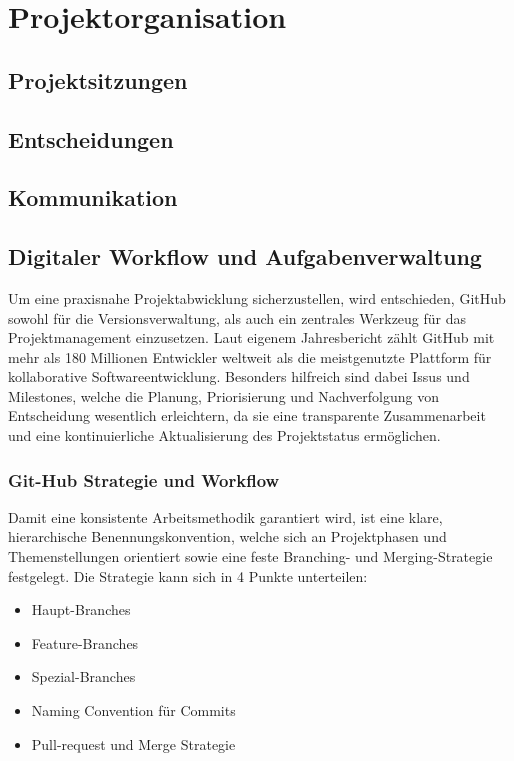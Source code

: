 \chapter{Projektorganisation}

\section{Projektsitzungen}
\section{Entscheidungen}
\section{Kommunikation}
\section{Digitaler Workflow und Aufgabenverwaltung}

Um eine praxisnahe Projektabwicklung sicherzustellen, wird entschieden, GitHub sowohl für die Versionsverwaltung, als auch ein zentrales Werkzeug für das Projektmanagement einzusetzen. Laut eigenem Jahresbericht\cite{github2025octoverse} zählt GitHub mit mehr als 180 Millionen Entwickler weltweit als die meistgenutzte Plattform für kollaborative Softwareentwicklung\cite{stackoverflow2025survey}. Besonders hilfreich sind dabei Issus und Milestones, welche die Planung, Priorisierung und Nachverfolgung von Entscheidung wesentlich erleichtern, da sie eine transparente Zusammenarbeit und eine kontinuierliche Aktualisierung des Projektstatus ermöglichen.

\subsection{Git-Hub Strategie und Workflow}
Damit eine konsistente Arbeitsmethodik garantiert wird, ist eine klare, hierarchische Benennungskonvention, welche sich an Projektphasen und Themenstellungen orientiert sowie eine feste Branching-\cite{git_branching_workflow_chacon2014progit} und Merging-Strategie festgelegt.
Die Strategie kann sich in 4 Punkte unterteilen:
\begin{itemize}
    \item Haupt-Branches
    \item Feature-Branches
    \item Spezial-Branches
    \item Naming Convention für Commits
    \item Pull-request und Merge Strategie
\end{itemize}
